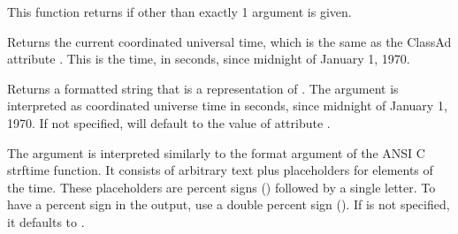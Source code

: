 \begin{description}
    This function returns  if other than exactly 1
    argument is given.

  \item[\Code{Integer time()}]
    Returns the current coordinated universal time, which is the same
    as the ClassAd attribute .
    This is the time, in seconds, since midnight of January 1, 1970.

  \item[\Code{String formatTime(\Lbr\ Integer time \Rbr\ \Lbr\ , String format \Rbr)}]

    Returns a formatted string that is a representation of .
    The argument  is interpreted as coordinated universe time in
    seconds, since midnight of January 1, 1970. If not specified,
     will default to the value of attribute .
		
    The argument  is interpreted similarly to the format
    argument of the ANSI C strftime function. It consists of arbitrary text
    plus placeholders for elements of the time. These placeholders are
    percent signs (\Percent) followed by a single letter.
    To have a percent sign in
    the output, use a double percent sign (\Percent\Percent).  If
     is not specified, it defaults to .


\end{description}
